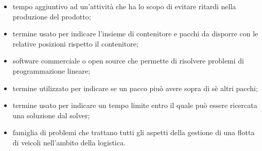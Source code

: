 \begin{itemize}
	\item {} tempo aggiuntivo ad un'attività che ha lo scopo di evitare ritardi nella produzione del prodotto;
	\item {}  termine usato per indicare l'insieme di contenitore e pacchi da disporre con le relative posizioni rispetto il contenitore;
	\item {} software commerciale o open source che permette di risolvere problemi di programmazione lineare;
	\item {} termine utilizzato per indicare se un pacco piuò avere sopra di sè altri pacchi;
	\item {} termine usato per indicare un tempo limite entro il quale può essere ricercata una soluzione dal solver;
	\item {} famiglia di problemi che trattano tutti gli aspetti della gestione di una flotta di veicoli nell'ambito della logistica.
\end{itemize} 
